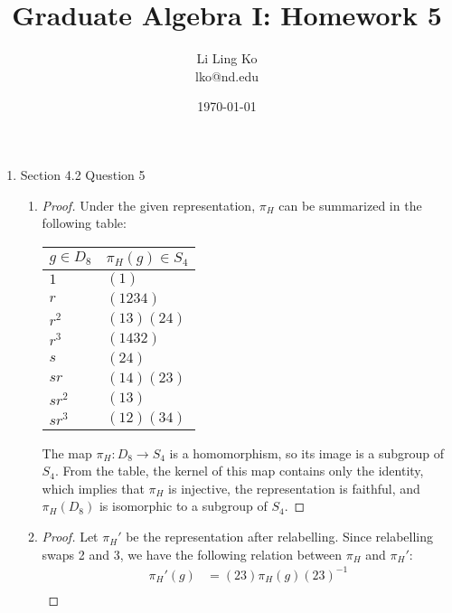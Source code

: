 \documentclass{article}
\begin{document}
\title{Graduate Algebra I: Homework 5}
\author{Li Ling Ko\\ lko@nd.edu}
\date{\today}
\maketitle

\begin{enumerate}
  \item Section 4.2 Question 5
    \begin{enumerate}
      \item
        \begin{proof}
          Under the given representation, $\pi_H$ can be summarized in the
          following table:
          \begin{center}
            \begin{tabular}{|l|l|}
              \hline
              $g\in D_8$ & $\pi_H(g)\in S_4$ \\
              \hline\hline
              $1$     & $(1)$ \\
              $r$     & $(1234)$ \\
              $r^2$   & $(13)(24)$ \\
              $r^3$   & $(1432)$ \\
              $s$     & $(24)$ \\
              $sr$    & $(14)(23)$ \\
              $sr^2$  & $(13)$ \\
              $sr^3$  & $(12)(34)$ \\
              \hline
            \end{tabular}
          \end{center}
          The map $\pi_H:D_8\rightarrow S_4$ is a homomorphism, so its
          image is a subgroup of $S_4$. From the table, the kernel of this
          map contains only the identity, which implies that $\pi_H$ is
          injective, the representation is faithful, and $\pi_H(D_8)$ is
          isomorphic to a subgroup of $S_4$.
        \end{proof}
      \item
        \begin{proof}
          Let $\pi_H'$ be the representation after relabelling. Since
          relabelling swaps 2 and 3, we have the following relation between
          $\pi_H$ and $\pi_H'$:
          \begin{align*}
            \pi_H'(g) &= (23)\pi_H(g)(23)^{-1} \\

\end{align*}
\end{proof}
\end{enumerate}
\end{enumerate}
\end{document}
